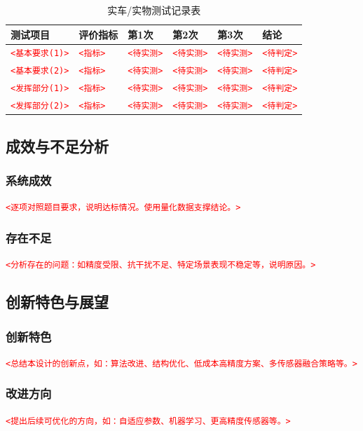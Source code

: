 \documentclass[12pt,a4paper,fontset=fandol]{ctexart}
\newcommand{\placeholder}[1]{\textcolor{red}{\texttt{<#1>}}}
\begin{document}
\begin{table}[H]
\centering
\caption{实车/实物测试记录表}
\small
\begin{tabularx}{\textwidth}{p{2.3cm}Yp{1.2cm}p{1.2cm}p{1.2cm}p{1.5cm}}
\toprule
测试项目 & 评价指标 & 第1次 & 第2次 & 第3次 & 结论\\
\midrule
\placeholder{基本要求(1)} & \placeholder{指标} & \placeholder{待实测} & \placeholder{待实测} & \placeholder{待实测} & \placeholder{待判定}\\
\placeholder{基本要求(2)} & \placeholder{指标} & \placeholder{待实测} & \placeholder{待实测} & \placeholder{待实测} & \placeholder{待判定}\\
\placeholder{发挥部分(1)} & \placeholder{指标} & \placeholder{待实测} & \placeholder{待实测} & \placeholder{待实测} & \placeholder{待判定}\\
\placeholder{发挥部分(2)} & \placeholder{指标} & \placeholder{待实测} & \placeholder{待实测} & \placeholder{待实测} & \placeholder{待判定}\\
\bottomrule
\end{tabularx}
\end{table}

\subsection{成效与不足分析}
\subsubsection*{系统成效}
\placeholder{逐项对照题目要求，说明达标情况。使用量化数据支撑结论。}

\subsubsection*{存在不足}
\placeholder{分析存在的问题：如精度受限、抗干扰不足、特定场景表现不稳定等，说明原因。}

\subsection{创新特色与展望}
\subsubsection*{创新特色}
\placeholder{总结本设计的创新点，如：算法改进、结构优化、低成本高精度方案、多传感器融合策略等。}

\subsubsection*{改进方向}
\placeholder{提出后续可优化的方向，如：自适应参数、机器学习、更高精度传感器等。}
\end{document}
